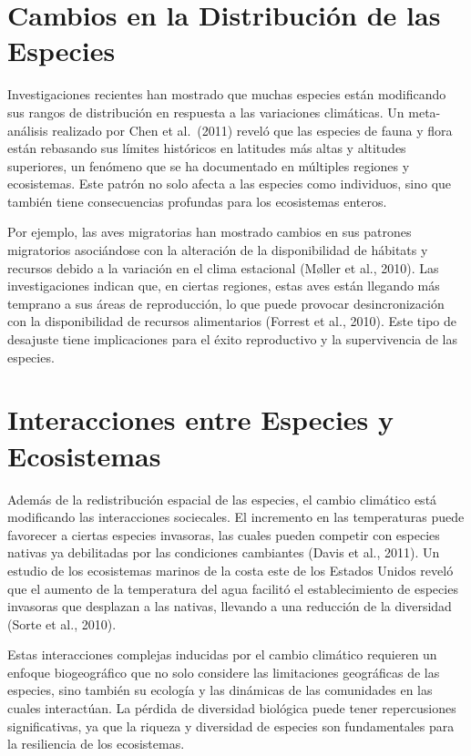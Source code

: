 \documentclass[
  letterpaper,
  DIV=11,
  numbers=noendperiod,
  oneside]{scrreprt}
\begin{document}
\section{Cambios en la Distribución de las
Especies}\label{cambios-en-la-distribuciuxf3n-de-las-especies}

Investigaciones recientes han mostrado que muchas especies están
modificando sus rangos de distribución en respuesta a las variaciones
climáticas. Un meta-análisis realizado por Chen et al.~(2011) reveló que
las especies de fauna y flora están rebasando sus límites históricos en
latitudes más altas y altitudes superiores, un fenómeno que se ha
documentado en múltiples regiones y ecosistemas. Este patrón no solo
afecta a las especies como individuos, sino que también tiene
consecuencias profundas para los ecosistemas enteros.

Por ejemplo, las aves migratorias han mostrado cambios en sus patrones
migratorios asociándose con la alteración de la disponibilidad de
hábitats y recursos debido a la variación en el clima estacional (Møller
et al., 2010). Las investigaciones indican que, en ciertas regiones,
estas aves están llegando más temprano a sus áreas de reproducción, lo
que puede provocar desincronización con la disponibilidad de recursos
alimentarios (Forrest et al., 2010). Este tipo de desajuste tiene
implicaciones para el éxito reproductivo y la supervivencia de las
especies.

\section{Interacciones entre Especies y
Ecosistemas}\label{interacciones-entre-especies-y-ecosistemas}

Además de la redistribución espacial de las especies, el cambio
climático está modificando las interacciones sociecales. El incremento
en las temperaturas puede favorecer a ciertas especies invasoras, las
cuales pueden competir con especies nativas ya debilitadas por las
condiciones cambiantes (Davis et al., 2011). Un estudio de los
ecosistemas marinos de la costa este de los Estados Unidos reveló que el
aumento de la temperatura del agua facilitó el establecimiento de
especies invasoras que desplazan a las nativas, llevando a una reducción
de la diversidad (Sorte et al., 2010).

Estas interacciones complejas inducidas por el cambio climático
requieren un enfoque biogeográfico que no solo considere las
limitaciones geográficas de las especies, sino también su ecología y las
dinámicas de las comunidades en las cuales interactúan. La pérdida de
diversidad biológica puede tener repercusiones significativas, ya que la
riqueza y diversidad de especies son fundamentales para la resiliencia
de los ecosistemas.
\end{document}
